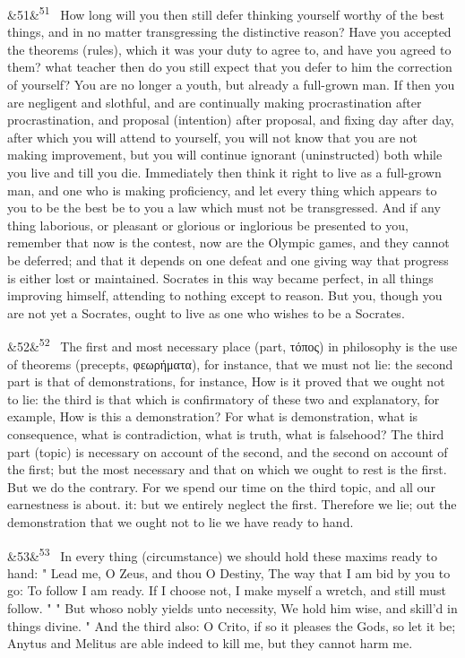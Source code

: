 \documentclass[12pt]{article}
\newcommand{\para}[1][]{\par\noindent\ifx&#1&\else\textsuperscript{\footnotesize #1}~\fi}
\begin{document}
\para[51] How long will you then still defer thinking yourself worthy of the best things, and in no matter transgressing the distinctive reason? Have you accepted the theorems (rules), which it was your duty to agree to, and have you agreed to them? what teacher then do you still expect that you defer to him the correction of yourself? You are no longer a youth, but already a full-grown man. If then you are negligent and slothful, and are continually making procrastination after procrastination, and proposal (intention) after proposal, and fixing day after day, after which you will attend to yourself, you will not know that you are not making improvement, but you will continue ignorant (uninstructed) both while you live and till you die. Immediately then think it right to live as a full-grown man, and one who is making proficiency, and let every thing which appears to you to be the best be to you a law which must not be transgressed. And if any thing laborious, or pleasant or glorious or inglorious be presented to you, remember that now is the contest, now are the Olympic games, and they cannot be deferred; and that it depends on one defeat and one giving way that progress is either lost or maintained. Socrates in this way became perfect, in all things improving himself, attending to nothing except to reason. But you, though you are not yet a Socrates, ought to live as one who wishes to be a Socrates.

\para[52] The first and most necessary place (part, τόπος) in philosophy is the use of theorems (precepts, φεωρήματα), for instance, that we must not lie: the second part is that of demonstrations, for instance, How is it proved that we ought not to lie: the third is that which is confirmatory of these two and explanatory, for example, How is this a demonstration? For what is demonstration, what is consequence, what is contradiction, what is truth, what is falsehood? The third part (topic) is necessary on account of the second, and the second on account of the first; but the most necessary and that on which we ought to rest is the first. But we do the contrary. For we spend our time on the third topic, and all our earnestness is about. it: but we entirely neglect the first. Therefore we lie; out the demonstration that we ought not to lie we have ready to hand.

\para[53] In every thing (circumstance) we should hold these maxims ready to hand: " Lead me, O Zeus, and thou O Destiny, The way that I am bid by you to go: To follow I am ready. If I choose not, I make myself a wretch, and still must follow. " " But whoso nobly yields unto necessity, We hold him wise, and skill'd in things divine. " And the third also: O Crito, if so it pleases the Gods, so let it be; Anytus and Melitus are able indeed to kill me, but they cannot harm me.
\end{document}
